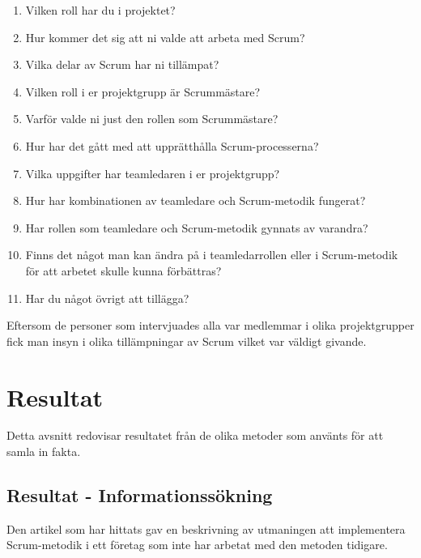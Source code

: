 \begin{enumerate}

\item Vilken roll har du i projektet?

\item Hur kommer det sig att ni valde att arbeta med Scrum?

\item Vilka delar av Scrum har ni tillämpat?

\item Vilken roll i er projektgrupp är Scrummästare?

\item Varför valde ni just den rollen som Scrummästare?

\item Hur har det gått med att upprätthålla Scrum-processerna?

\item Vilka uppgifter har teamledaren i er projektgrupp?

\item Hur har kombinationen av teamledare och Scrum-metodik fungerat?

\item Har rollen som teamledare och Scrum-metodik gynnats av varandra?

\item Finns det något man kan ändra på i teamledarrollen eller i Scrum-metodik för att arbetet skulle kunna förbättras?

\item Har du något övrigt att tillägga?

\end{enumerate}

Eftersom de personer som intervjuades alla var medlemmar i olika projektgrupper fick man insyn i olika tillämpningar av Scrum vilket var väldigt givande.

\section{Resultat}
Detta avsnitt redovisar resultatet från de olika metoder som använts för att samla in fakta.

\subsection{Resultat - Informationssökning}
Den artikel som har hittats gav en beskrivning av utmaningen att implementera Scrum-metodik i ett företag som inte har arbetat med den metoden tidigare. 

